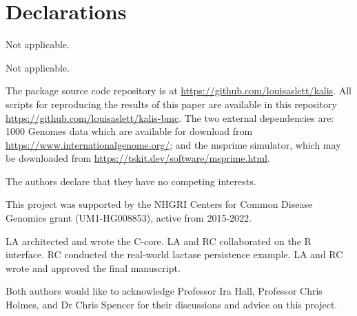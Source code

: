 \documentclass[pdflatex,referee,lineno,sn-nature]{sn-jnl}%
\begin{document}
\section*{Declarations}


Not applicable.


Not applicable.


The package source code repository is at \url{https://github.com/louisaslett/kalis}.
All scripts for reproducing the results of this paper are available in this repository \url{https://github.com/louisaslett/kalis-bmc}.
The two external dependencies are: 1000 Genomes data which are available for download from \url{https://www.internationalgenome.org/}; and the msprime simulator, which may be downloaded from \url{https://tskit.dev/software/msprime.html}.


The authors declare that they have no competing interests.


This project was supported by the NHGRI Centers for Common Disease Genomics grant (UM1-HG008853), active from 2015-2022.


LA architected and wrote the C-core.
LA and RC collaborated on the R interface.
RC conducted the real-world lactase persistence example.
LA and RC wrote and approved the final manuscript.


Both authors would like to acknowledge Professor Ira Hall, Professor Chris Holmes, and Dr Chris Spencer for their discussions and advice on this project.



\end{document}

